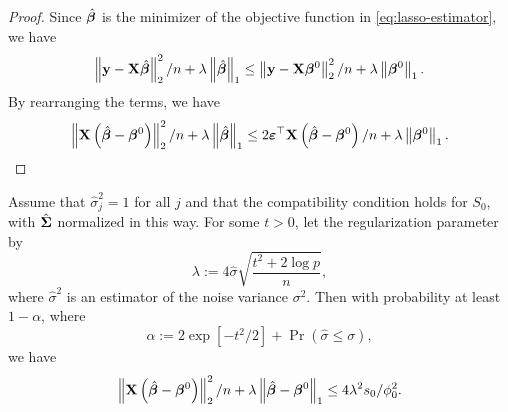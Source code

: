 \begin{proof}
	Since $\hat{\boldsymbol{\beta}}$ is the minimizer of the objective function in \eqref{eq:lasso-estimator}, we have
	\begin{equation*}
		\left\|{\bf y}-{\bf X}\hat{\boldsymbol{\beta}}\right\|_{2}^{2}/n+\lambda\left\|\hat{\boldsymbol{\beta}}\right\|_{1}\leq\left\|{\bf y}-{\bf X}\boldsymbol{\beta}^{0}\right\|_{2}^{2}/n+\lambda\left\|\boldsymbol{\beta}^{0}\right\|_{1}.
	\end{equation*}
	By rearranging the terms, we have
	\begin{equation*}
		\left\|{\bf X}\left(\hat{\boldsymbol{\beta}}-\boldsymbol{\beta}^{0}\right)\right\|_{2}^{2}/n+\lambda\left\|\hat{\boldsymbol{\beta}}\right\|_{1}\leq 2\boldsymbol{\varepsilon}^{\top}{\bf X}\left(\hat{\boldsymbol{\beta}}-\boldsymbol{\beta}^{0}\right)/n+\lambda\left\|\boldsymbol{\beta}^{0}\right\|_{1}.
	\end{equation*}
\end{proof}

\begin{corollary}
	Assume that $\hat{\sigma}_j^{2}=1$ for all $j$ and that the compatibility condition holds for $S_{0}$, with $\hat{\boldsymbol{\Sigma}}$ normalized in this way. For some $t>0$, let the regularization parameter by
	\begin{equation*}
		\lambda:=4\hat{\sigma}\sqrt{\frac{t^{2}+2\log p}{n}},
	\end{equation*}
	where $\hat{\sigma}^{2}$ is an estimator of the noise variance $\sigma^{2}$. Then with probability at least $1-\alpha$, where
	\begin{equation*}
		\alpha:=2\exp\left[-t^{2}/2\right]+\Pr(\hat{\sigma}\leq\sigma),
	\end{equation*}
	we have
	\begin{equation*}
		\left\|{\bf X}\left(\hat{\boldsymbol{\beta}}-\boldsymbol{\beta}^{0}\right)\right\|_{2}^{2}/n+\lambda\left\|\hat{\boldsymbol{\beta}}-\boldsymbol{\beta}^{0}\right\|_{1}\leq 4 \lambda^{2}s_{0}/\phi_{0}^{2}.
	\end{equation*}
\end{corollary}

